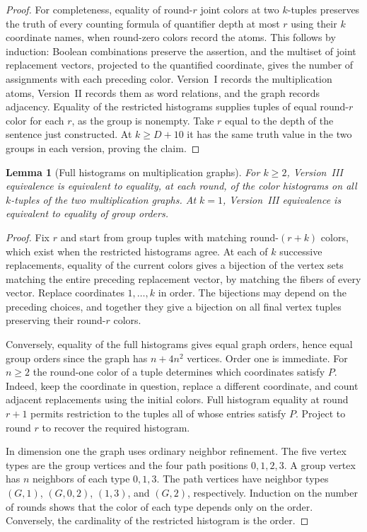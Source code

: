 \documentclass[11pt]{article}
\newtheorem{lemma}[theorem]{Lemma}
\theoremstyle{definition}
\theoremstyle{remark}
\numberwithin{equation}{section}
\begin{document}
\begin{proof}
For completeness, equality of round-$r$ joint colors at two
$k$-tuples preserves the truth of every counting formula of
quantifier depth at most $r$ using their $k$ coordinate names, when
round-zero colors record the atoms. This follows by induction:
Boolean combinations preserve the assertion, and the multiset of
joint replacement vectors, projected to the quantified coordinate,
gives the number of assignments with each preceding color.
Version~I records the multiplication atoms, Version~II records them
as word relations, and the graph records adjacency. Equality of the
restricted histograms supplies tuples of equal round-$r$ color for
each $r$, as the group is nonempty. Take $r$ equal to the depth of
the sentence just constructed. At $k\ge D+10$ it has the same
truth value in the two groups in each version, proving the claim.
\end{proof}

\begin{lemma}[Full histograms on multiplication graphs]
\label{hu:full-gadget}
For $k\ge2$, Version~III equivalence is equivalent to equality, at
each round, of the color histograms on \emph{all} $k$-tuples of the
two multiplication graphs. At $k=1$, Version~III equivalence is
equivalent to equality of group orders.
\end{lemma}
\begin{proof}
Fix $r$ and start from group tuples with matching round-$(r+k)$
colors, which exist when the restricted histograms agree. At each
of $k$ successive replacements, equality of the current colors
gives a bijection of the vertex sets matching the entire preceding
replacement vector, by matching the fibers of every vector. Replace
coordinates $1,\ldots,k$ in order. The bijections may depend on the
preceding choices, and together they give a bijection on all final
vertex tuples preserving their round-$r$ colors.

Conversely, equality of the full histograms gives equal graph orders,
hence equal group orders since the graph has $n+4n^2$ vertices.
Order one is immediate. For $n\ge2$ the round-one color of a tuple
determines which coordinates satisfy $P$. Indeed, keep the coordinate
in question, replace a different coordinate, and count adjacent
replacements using the initial colors. Full histogram equality at
round $r+1$ permits restriction to the tuples all of whose entries
satisfy $P$. Project to round $r$ to recover the required histogram.

In dimension one the graph uses ordinary neighbor refinement. The
five vertex types are the group vertices and the four path positions
$0,1,2,3$. A group vertex has $n$ neighbors of each type $0,1,3$.
The path vertices have neighbor types $(G,1)$, $(G,0,2)$, $(1,3)$,
and $(G,2)$, respectively. Induction on the number of rounds shows
that the color of each type depends only on the order. Conversely,
the cardinality of the restricted histogram is the order.
\end{proof}
\end{document}
